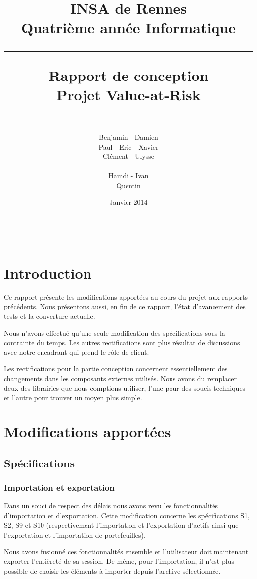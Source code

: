 \documentclass[a4paper,titlepage,french]{report}
\title{INSA de Rennes \\ Quatrième année Informatique \\ \bigskip \hrule \bigskip Rapport de conception \\ \bigskip Projet Value-at-Risk \bigskip \hrule}
\author{Benjamin \bsc{Bouguet} - Damien \bsc{Carduner} \\Paul \bsc{Chaignon} - Eric \bsc{Chauty} - Xavier \bsc{Fraboulet} \\ Clément \bsc{Gautrais} - Ulysse \bsc{Goarant} \\ ~~\\
Hamdi \bsc{Raissi} - Ivan \bsc{Le Plumey} \\ Quentin \bsc{Giai Gianetto}}
\date{Janvier 2014}
\begin{document}
\maketitle

\thispagestyle{empty}
\newpage

~~
\thispagestyle{empty}
\newpage

\tableofcontents
\newpage


\chapter*{Introduction}

Ce rapport présente les modifications apportées au cours du projet aux rapports précédents.
Nous présentons aussi, en fin de ce rapport, l'état d'avancement des tests et la couverture actuelle.

Nous n'avons effectué qu'une seule modification des spécifications sous la contrainte du temps.
Les autres rectifications sont plus résultat de discussions avec notre encadrant qui prend le rôle de client.

Les rectifications pour la partie conception concernent essentiellement des changements dans les composants externes utilisés.
Nous avons du remplacer deux des librairies que nous comptions utiliser, l'une pour des soucis techniques et l'autre pour trouver un moyen plus simple.


\chapter{Modifications apportées}

\section{Spécifications}

\subsection{Importation et exportation}

Dans un souci de respect des délais nous avons revu les fonctionnalités d'importation et d'exportation.
Cette modification concerne les spécifications S1, S2, S9 et S10 (respectivement l'importation et l'exportation d'actifs ainsi que l'exportation et l'importation de portefeuilles).

Nous avons fusionné ces fonctionnalités ensemble et l'utilisateur doit maintenant exporter l'entièreté de sa session.
De même, pour l'importation, il n'est plus possible de choisir les éléments à importer depuis l'archive sélectionnée.
\end{document}
